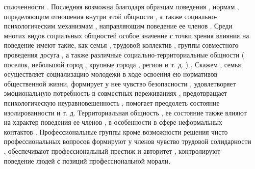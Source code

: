 \documentclass[12pt]{article}
\begin{document}
сплоченности  .  Последняя  возможна  благодаря  образцам  поведения  ,  нормам  ,  определяющим  отношения
внутри  этой  общности  ,  а  также  социально-психологическим  механизмам  ,  направляющим  поведение  ее
членов .
Среди многих видов социальных общностей особое значение с точки зрения влияния на поведение имеют
такие, как семья , трудовой коллектив , группы совместного проведения досуга , а также различные социально-территориальные общности ( поселок, небольшой город , крупные города , регион и т. д. ) . Скажем , семья
осуществляет социализацию молодежи в ходе освоения ею нормативов общественной жизни, формирует у нее
чувство  безопасности  ,  удовлетворяет  эмоциональную  потребность  в  совместных  переживаниях  ,
предотвращает психологическую неуравновешенность , помогает преодолеть состояние изолированности и т. д.
Территориальная общность , ее состояние также влияют на характер поведения ее членов , в особенности в
сфере  неформальных  контактов  .  Профессиональные  группы  кроме  возможности  решения  чисто
профессиональных  вопросов  формируют  у  членов  чувство  трудовой  солидарности  ,  обеспечивают
профессиональный  престиж  и  авторитет  ,  контролируют  поведение  людей  с  позиций  профессиональной
морали. 

\newpage
\end{document}
